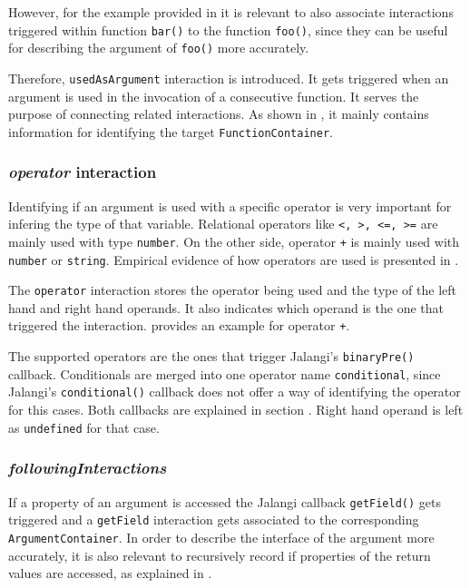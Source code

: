 However, for the example provided in  it is relevant to also associate interactions triggered within function \texttt{bar()} to the function \texttt{foo()}, since they can  be useful for describing the argument of \texttt{foo()} more accurately.

Therefore, \texttt{usedAsArgument} interaction is introduced. It gets triggered when an argument is used in the invocation of a consecutive function. It serves the purpose of connecting related interactions. As shown in , it mainly contains information for identifying the target \texttt{FunctionContainer}.



\subsubsection{\textit{operator} interaction}
Identifying if an argument is used with a specific operator is very important for infering the type of that variable. Relational operators like \texttt{<, >, <=, >=} are mainly used with type \texttt{number}. On the other side, operator \texttt{+} is mainly used with \texttt{number} or \texttt{string}. Empirical evidence of how operators are used is presented in .

The \texttt{operator} interaction stores the operator being used and the type of the left hand and right hand operands. It also indicates which operand is the one that triggered the interaction.  provides an example for operator \texttt{+}.

The supported operators are the ones that trigger Jalangi's \texttt{binaryPre()} callback. Conditionals are merged into one operator name \texttt{conditional}, since Jalangi's \texttt{conditional()} callback does not offer a way of identifying the operator for this cases. Both callbacks are explained in section . Right hand operand is left as \texttt{undefined} for that case.



\subsubsection{\textit{followingInteractions}}
If a property of an argument is accessed the Jalangi callback \texttt{getField()} gets triggered and a \texttt{getField} interaction gets associated to the corresponding \texttt{ArgumentContainer}. In order to describe the interface of the argument more accurately, it is also relevant to recursively record if properties of the return values are accessed, as explained in .


